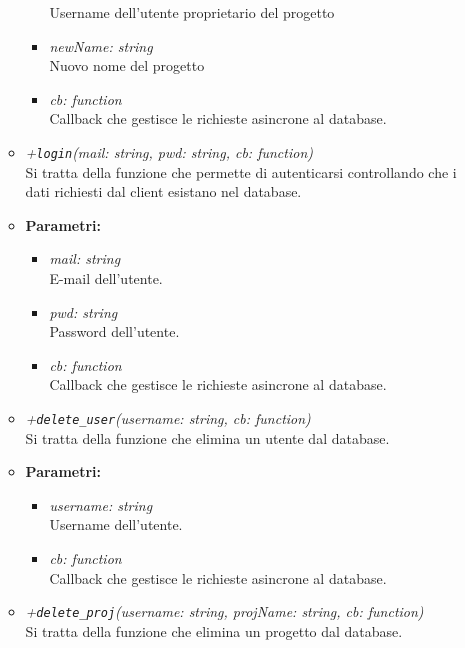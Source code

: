 \begin{itemize}
\begin{itemize}
\begin{itemize}
              Username dell'utente proprietario del progetto
              \item \emph{newName: string}\\
              Nuovo nome del progetto
              \item \emph{cb: function}\\
              Callback che gestisce le richieste asincrone al database.
            \end{itemize}
            \item \emph{+\texttt{login}(mail: string, pwd: string, cb: function)}\\
            Si tratta della funzione che permette di autenticarsi controllando che i dati richiesti dal client esistano nel database.\\
            \item \textbf{Parametri: }
            \begin{itemize}
              \item \emph{mail: string}\\
              E-mail dell'utente.
              \item \emph{pwd: string}\\
              Password dell'utente.
              \item \emph{cb: function}\\
              Callback che gestisce le richieste asincrone al database.
            \end{itemize}
            \item \emph{+\texttt{delete\_user}(username: string, cb: function)}\\
            Si tratta della funzione che elimina un utente dal database.\\
            \item \textbf{Parametri: }
            \begin{itemize}
              \item \emph{username: string}\\
              Username dell'utente.
              \item \emph{cb: function}\\
              Callback che gestisce le richieste asincrone al database.
            \end{itemize}
            \item \emph{+\texttt{delete\_proj}(username: string, projName: string, cb: function)}\\
            Si tratta della funzione che elimina un progetto dal database.\\

\end{itemize}
\end{itemize}
